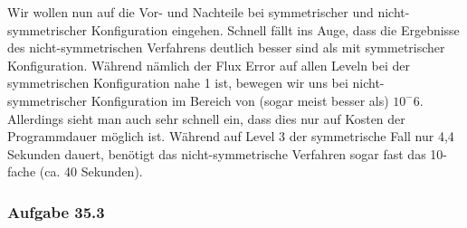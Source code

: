 \begin{figure}[H]
	\centering
\end{figure}


\begin{figure}[H]
	\centering
\end{figure}

Wir wollen nun auf die Vor- und Nachteile bei symmetrischer und nicht-symmetrischer Konfiguration eingehen.
Schnell fällt ins Auge, dass die Ergebnisse des nicht-symmetrischen Verfahrens deutlich besser sind als mit symmetrischer Konfiguration. Während nämlich der Flux Error auf allen Leveln bei der symmetrischen Konfiguration nahe 1 ist, bewegen wir uns bei nicht-symmetrischer Konfiguration im Bereich von (sogar meist besser als) $10^-6$. Allerdings sieht man auch sehr schnell ein, dass dies nur auf Kosten der Programmdauer möglich ist. Während auf Level 3 der symmetrische Fall nur 4,4 Sekunden dauert, benötigt das nicht-symmetrische Verfahren sogar fast das 10-fache (ca. 40 Sekunden). 

\subsubsection{Aufgabe 35.3}
\begin{figure}[H]
	\centering
\end{figure}

